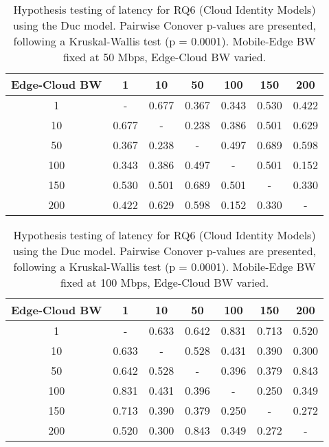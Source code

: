 \begin{table}[H]
\caption{Hypothesis testing of latency for RQ6 (Cloud Identity Models) using the Duc model. Pairwise Conover p-values are presented, following a Kruskal-Wallis test (p = 0.0001). Mobile-Edge BW fixed at 50 Mbps, Edge-Cloud BW varied.}
\centering
\begin{tabular}{c|cccccc}
Edge-Cloud BW & 1 & 10 & 50 & 100 & 150 & 200 \\
\hline
1 & - & 0.677 & 0.367 & 0.343 & 0.530 & 0.422 \\
10 & 0.677 & - & 0.238 & 0.386 & 0.501 & 0.629 \\
50 & 0.367 & 0.238 & - & 0.497 & 0.689 & 0.598 \\
100 & 0.343 & 0.386 & 0.497 & - & 0.501 & 0.152 \\
150 & 0.530 & 0.501 & 0.689 & 0.501 & - & 0.330 \\
200 & 0.422 & 0.629 & 0.598 & 0.152 & 0.330 & - \\
\end{tabular}
\end{table}

\begin{table}[H]
\caption{Hypothesis testing of latency for RQ6 (Cloud Identity Models) using the Duc model. Pairwise Conover p-values are presented, following a Kruskal-Wallis test (p = 0.0001). Mobile-Edge BW fixed at 100 Mbps, Edge-Cloud BW varied.}
\centering
\begin{tabular}{c|cccccc}
Edge-Cloud BW & 1 & 10 & 50 & 100 & 150 & 200 \\
\hline
1 & - & 0.633 & 0.642 & 0.831 & 0.713 & 0.520 \\
10 & 0.633 & - & 0.528 & 0.431 & 0.390 & 0.300 \\
50 & 0.642 & 0.528 & - & 0.396 & 0.379 & 0.843 \\
100 & 0.831 & 0.431 & 0.396 & - & 0.250 & 0.349 \\
150 & 0.713 & 0.390 & 0.379 & 0.250 & - & 0.272 \\
200 & 0.520 & 0.300 & 0.843 & 0.349 & 0.272 & - \\
\end{tabular}
\end{table}

